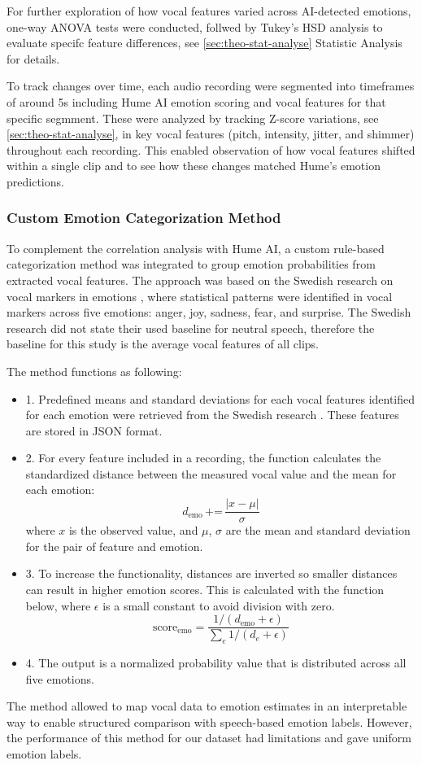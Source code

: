 For further exploration of how vocal features varied across AI-detected emotions, one-way ANOVA tests were conducted, follwed by Tukey's HSD analysis to evaluate specifc feature differences, see \ref{sec:theo-stat-analyse} Statistic Analysis for details.  

To track changes over time, each audio recording were segmented into timeframes of around 5s including Hume AI emotion scoring and vocal features for that specific segmment. These were analyzed by tracking Z-score variations, see \ref{sec:theo-stat-analyse}, in key vocal features (pitch, intensity, jitter, and shimmer) throughout each recording. 
This enabled observation of how vocal features shifted within a single clip and to see how these changes matched Hume's emotion predictions. 

\subsubsection{Custom Emotion Categorization Method}
To complement the correlation analysis with Hume AI, a custom rule-based categorization method was integrated to group emotion probabilities from extracted vocal features. 
The approach was based on the Swedish research on vocal markers in emotions \autocite{Ekberg2023}, where statistical patterns were identified in vocal markers across five emotions: 
anger, joy, sadness, fear, and surprise. The Swedish research did not state their used baseline for neutral speech, therefore the baseline for this study is the average vocal features of all clips. 

The method functions as following: 
\begin{itemize}
    \item 1. Predefined means and standard deviations for each vocal features identified for each emotion were retrieved from the Swedish research \autocite{Ekberg2023}. These features are stored in JSON format. 
    \item 2. For every feature included in a recording, the function calculates the standardized distance between the measured vocal value and the mean for each emotion: 
    \[
    d_{\text{emo}} \, \text{+=} \, \frac{|x - \mu|}{\sigma}
    \]
    where \( x \) is the observed value, and \( \mu \), \( \sigma \) are the mean and standard deviation for the pair of feature and emotion.  
    \item 3. To increase the functionality, distances are inverted so smaller distances can result in higher emotion scores. 
    This is calculated with the function below, where \( \epsilon \) is a small constant to avoid division with zero. 
    \[
    \text{score}_{\text{emo}} = \frac{1 / (d_{\text{emo}} + \epsilon)}{\sum_{e} 1 / (d_{e} + \epsilon)}
    \]
    \item 4. The output is a normalized probability value that is distributed across all five emotions. 
\end{itemize}
The method allowed to map vocal data to emotion estimates in an interpretable way to enable structured comparison with speech-based emotion labels. 
However, the performance of this method for our dataset had limitations and gave uniform emotion labels. 

